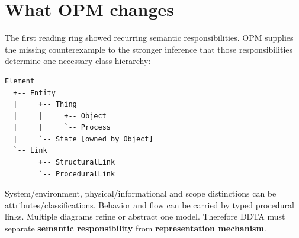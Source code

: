 \documentclass[10pt,a4paper]{article}
\begin{document}
\section{What OPM changes}
The first reading ring showed recurring semantic responsibilities. OPM supplies the missing counterexample to the stronger inference that those responsibilities determine one necessary class hierarchy:
\begin{lstlisting}
Element
  +-- Entity
  |     +-- Thing
  |     |     +-- Object
  |     |     `-- Process
  |     `-- State [owned by Object]
  `-- Link
        +-- StructuralLink
        `-- ProceduralLink
\end{lstlisting}
System/environment, physical/informational and scope distinctions can be attributes/classifications. Behavior and flow can be carried by typed procedural links. Multiple diagrams refine or abstract one model. Therefore DDTA must separate \textbf{semantic responsibility} from \textbf{representation mechanism}.
\clearpage
\end{document}
